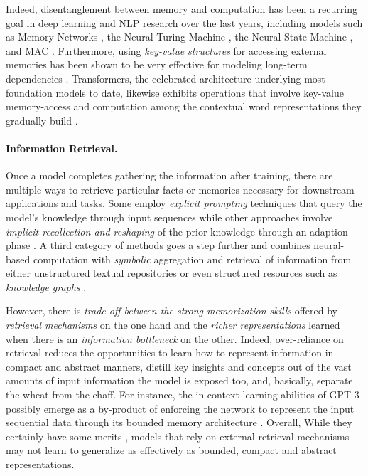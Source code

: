 Indeed, disentanglement between memory and computation has been a recurring goal in deep learning and NLP research over the last years, including models such as Memory Networks \citep{Weston2015MemoryN,Sukhbaatar2015WeaklySM}, the Neural Turing Machine \citep{ntm,dnc}, the Neural State Machine \citep{nsm}, and MAC \citep{mac}. Furthermore, using \textit{key-value structures} \citep{kv} for accessing external memories has been shown to be very effective for modeling long-term dependencies \citep{ent,Bosselut2018SimulatingAD,Lample2019LargeML}. Transformers, the celebrated architecture underlying most foundation models to date, likewise exhibits operations that involve key-value memory-access and computation among the contextual word representations they gradually build \citep{Geva2020TransformerFL}. 

\paragraph{Information Retrieval.} Once a model completes gathering the information after training, there are multiple ways to retrieve particular facts or memories necessary for downstream applications and tasks. Some employ \textit{explicit prompting} techniques that query the model's knowledge through input sequences \citep{Petroni2019LanguageMA,Kassner2021MultilingualLI,jiang-etal-2020-know}  while other approaches involve \textit{implicit recollection and reshaping} of the prior knowledge through an adaption phase \citep{Bosselut2019COMETCT,Hwang2021COMETATOMIC2O}. A third category of methods goes a step further and combines neural-based computation with \textit{symbolic} aggregation and retrieval of information from either unstructured textual repositories \citep{karpukhin2020dense,lewis2020retrieval,Khattab-etal:2020:OpenQA} or even structured resources such as \textit{knowledge graphs} \citep{Zhang2019ERNIEEL,Peters2019KnowledgeEC,Liu2020KBERTEL,Verga2020FactsAE,yasunaga2021qagnn}.

However, there is \textit{trade-off between the strong memorization skills} offered by \textit{retrieval mechanisms} on the one hand and the \textit{richer representations} learned when there is an \textit{information bottleneck} on the other. Indeed, over-reliance on retrieval reduces the opportunities to learn how to represent information in compact and abstract manners, distill key insights and concepts out of the vast amounts of input information the model is exposed too, and, basically, separate the wheat from the chaff. For instance, the in-context learning abilities of GPT-3 possibly emerge  as a by-product of enforcing the network to represent the input sequential data through its bounded memory architecture \citep{brown2020gpt3}. Overall, While they certainly have some merits \citep{guu2020realm}, models that rely on external retrieval mechanisms may not learn to generalize as effectively as bounded, compact and abstract representations.

